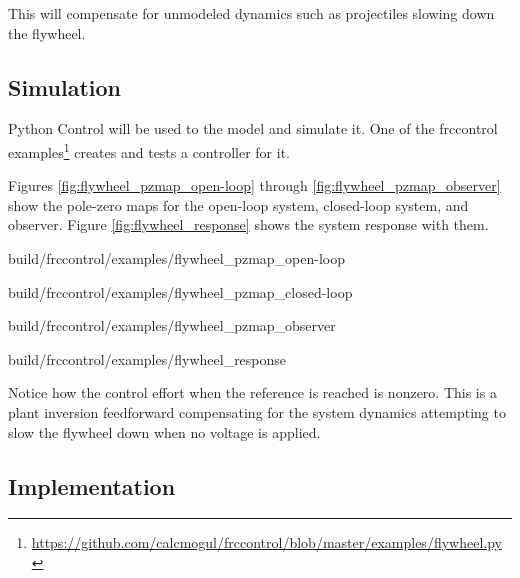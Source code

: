 This will compensate for unmodeled dynamics such as projectiles slowing down the
flywheel.

\subsection{Simulation}

Python Control will be used to  the
\gls{model} and simulate it. One of the frccontrol
examples\footnote{\url{https://github.com/calcmogul/frccontrol/blob/master/examples/flywheel.py}}
creates and tests a controller for it.

Figures \ref{fig:flywheel_pzmap_open-loop} through
\ref{fig:flywheel_pzmap_observer} show the pole-zero maps for the open-loop
\gls{system}, closed-loop \gls{system}, and \gls{observer}. Figure
\ref{fig:flywheel_response} shows the \gls{system} response with them.

\begin{bookfigure}
  \begin{minisvg}{3}{build/frccontrol/examples/flywheel_pzmap_open-loop}
    \caption{Flywheel open-loop pole-zero map}
    \label{fig:flywheel_pzmap_open-loop}
  \end{minisvg}
  \hfill
  \begin{minisvg}{3}{build/frccontrol/examples/flywheel_pzmap_closed-loop}
    \caption{Flywheel closed-loop pole-zero map}
    \label{fig:flywheel_pzmap_closed-loop}
  \end{minisvg}
  \hfill
  \begin{minisvg}{3}{build/frccontrol/examples/flywheel_pzmap_observer}
    \caption{Flywheel observer pole-zero map}
    \label{fig:flywheel_pzmap_observer}
  \end{minisvg}
\end{bookfigure}

\begin{svg}{build/frccontrol/examples/flywheel_response}
  \caption{Flywheel response}
  \label{fig:flywheel_response}
\end{svg}

Notice how the \gls{control effort} when the \gls{reference} is reached is
nonzero. This is a plant inversion feedforward compensating for the \gls{system}
dynamics attempting to slow the flywheel down when no voltage is applied.

\subsection{Implementation}

